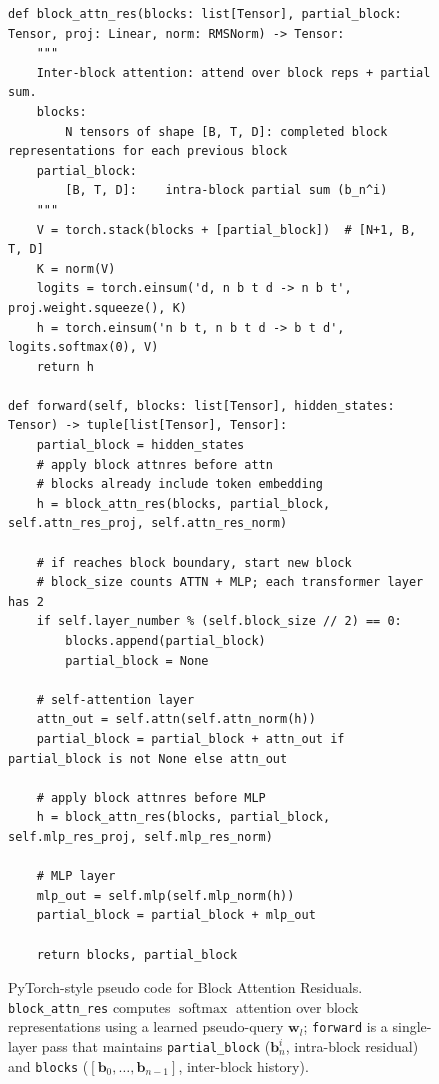 \begin{figure}[t!]
    \centering
    \let\textit\textup
    \begin{verbatim}
def block_attn_res(blocks: list[Tensor], partial_block: Tensor, proj: Linear, norm: RMSNorm) -> Tensor:
    """
    Inter-block attention: attend over block reps + partial sum.
    blocks:
        N tensors of shape [B, T, D]: completed block representations for each previous block
    partial_block:
        [B, T, D]:    intra-block partial sum (b_n^i)
    """
    V = torch.stack(blocks + [partial_block])  # [N+1, B, T, D]
    K = norm(V)
    logits = torch.einsum('d, n b t d -> n b t', proj.weight.squeeze(), K)
    h = torch.einsum('n b t, n b t d -> b t d', logits.softmax(0), V)
    return h

def forward(self, blocks: list[Tensor], hidden_states: Tensor) -> tuple[list[Tensor], Tensor]:
    partial_block = hidden_states
    # apply block attnres before attn
    # blocks already include token embedding
    h = block_attn_res(blocks, partial_block, self.attn_res_proj, self.attn_res_norm)

    # if reaches block boundary, start new block
    # block_size counts ATTN + MLP; each transformer layer has 2
    if self.layer_number % (self.block_size // 2) == 0:
        blocks.append(partial_block)
        partial_block = None

    # self-attention layer
    attn_out = self.attn(self.attn_norm(h))
    partial_block = partial_block + attn_out if partial_block is not None else attn_out

    # apply block attnres before MLP
    h = block_attn_res(blocks, partial_block, self.mlp_res_proj, self.mlp_res_norm)

    # MLP layer
    mlp_out = self.mlp(self.mlp_norm(h))
    partial_block = partial_block + mlp_out

    return blocks, partial_block
\end{verbatim}
    \caption{PyTorch-style pseudo code for Block Attention Residuals. \texttt{block\_attn\_res} computes $\operatorname{softmax}$ attention over block representations using a learned pseudo-query $\bm{w}_l$; \texttt{forward} is a single-layer pass that maintains \texttt{partial\_block} ($\bm{b}_n^i$, intra-block residual) and \texttt{blocks} ($[\bm{b}_0, \ldots, \bm{b}_{n-1}]$, inter-block history).}
    \label{listing:attnres}
\end{figure}

